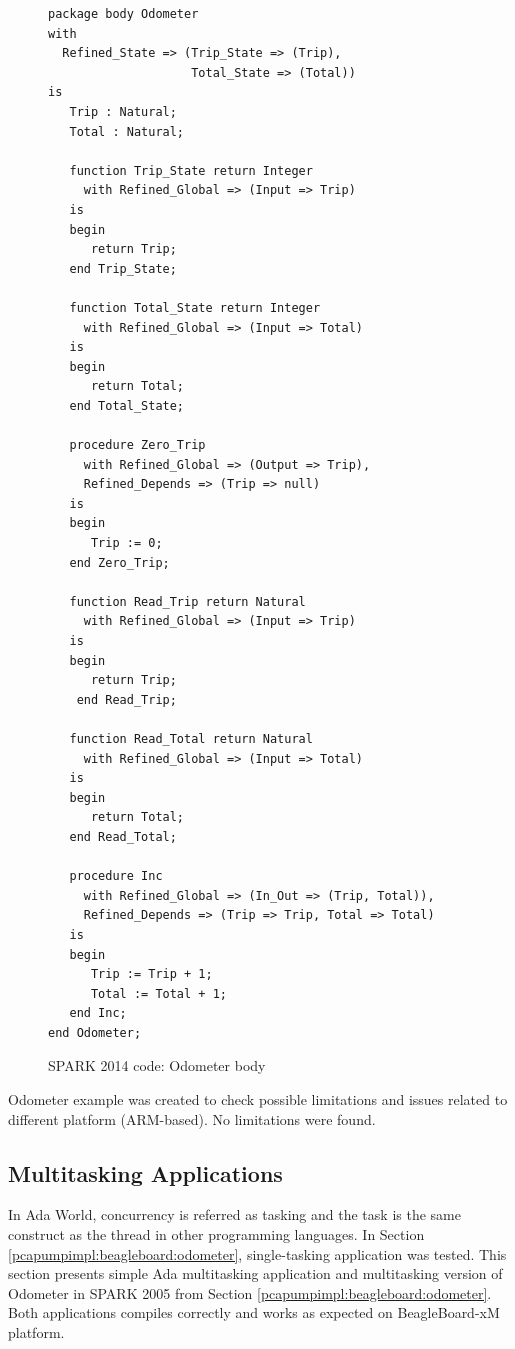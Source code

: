 \begin{figure}
\singlespacing
\begin{lstlisting}[language=ada2012, frame=single, gobble=0]
package body Odometer
with
  Refined_State => (Trip_State => (Trip),
                    Total_State => (Total))
is
   Trip : Natural;
   Total : Natural;

   function Trip_State return Integer
     with Refined_Global => (Input => Trip)
   is
   begin
      return Trip;
   end Trip_State;

   function Total_State return Integer
     with Refined_Global => (Input => Total)
   is
   begin
      return Total;
   end Total_State;

   procedure Zero_Trip
     with Refined_Global => (Output => Trip),
     Refined_Depends => (Trip => null)
   is
   begin
      Trip := 0;
   end Zero_Trip;

   function Read_Trip return Natural
     with Refined_Global => (Input => Trip)
   is
   begin
      return Trip;
    end Read_Trip;

   function Read_Total return Natural
     with Refined_Global => (Input => Total)
   is
   begin
      return Total;
   end Read_Total;

   procedure Inc
     with Refined_Global => (In_Out => (Trip, Total)),
     Refined_Depends => (Trip => Trip, Total => Total)
   is
   begin
      Trip := Trip + 1;
      Total := Total + 1;
   end Inc;
end Odometer;
\end{lstlisting}
\doublespacing
\caption{SPARK 2014 code: Odometer body}
\label{listing:Odometer2014_body}
\end{figure}

Odometer example was created to check possible limitations and issues related to different platform (ARM-based). No limitations were found.


\subsection{Multitasking Applications}
\label{pcapumpimpl:beagleboard:multitasking}

In Ada World, concurrency is referred as tasking and the task is the same construct as the thread in other programming languages. In Section \ref{pcapumpimpl:beagleboard:odometer}, single-tasking application was tested. This section presents simple Ada multitasking application and multitasking version of Odometer in SPARK 2005 from Section \ref{pcapumpimpl:beagleboard:odometer}. Both applications compiles correctly and works as expected on BeagleBoard-xM platform.


